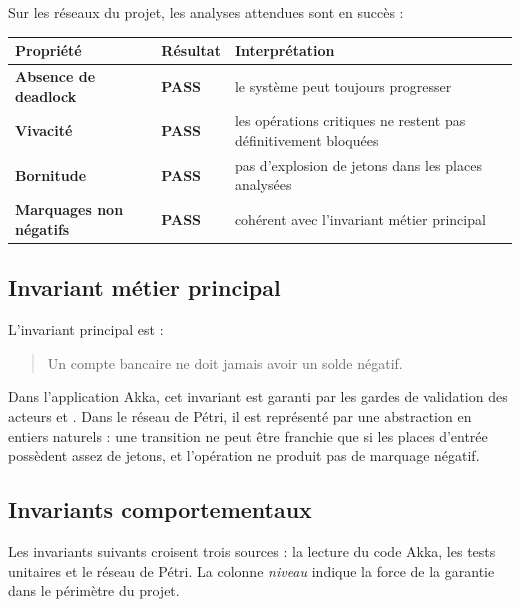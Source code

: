 \documentclass[11pt,a4paper]{article}
\newcommand{\code}[1]{\path{#1}}
\newcommand{\pass}{\textbf{\textcolor{green!45!black}{PASS}}}
\begin{document}
Sur les réseaux du projet, les analyses attendues sont en succès :

\begin{center}
\begin{tabularx}{\textwidth}{>{\bfseries}l l X}
\toprule
Propriété & Résultat & Interprétation \\
\midrule
Absence de deadlock & \pass & le système peut toujours progresser \\
Vivacité & \pass & les opérations critiques ne restent pas définitivement bloquées \\
Bornitude & \pass & pas d'explosion de jetons dans les places analysées \\
Marquages non négatifs & \pass & cohérent avec l'invariant métier principal \\
\bottomrule
\end{tabularx}
\end{center}

\subsection{Invariant métier principal}

L'invariant principal est :

\begin{quote}
Un compte bancaire ne doit jamais avoir un solde négatif.
\end{quote}

Dans l'application Akka, cet invariant est garanti par les gardes de validation des acteurs \code{Banque} et \code{Compte}. Dans le réseau de Pétri, il est représenté par une abstraction en entiers naturels : une transition ne peut être franchie que si les places d'entrée possèdent assez de jetons, et l'opération \code{decrement} ne produit pas de marquage négatif.

\subsection{Invariants comportementaux}

Les invariants suivants croisent trois sources : la lecture du code Akka, les tests unitaires et le réseau de Pétri. La colonne \emph{niveau} indique la force de la garantie dans le périmètre du projet.
\end{document}
